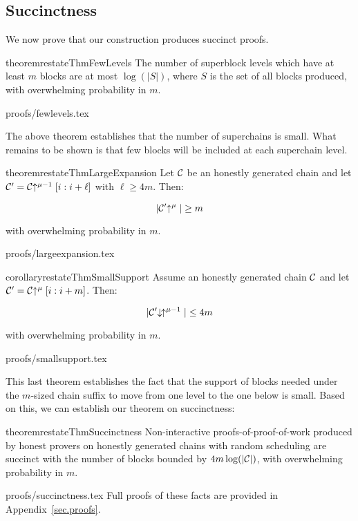 \subsection{Succinctness}

We now prove that our construction produces succinct proofs.

\begin{restatable}{theorem}{restateThmFewLevels}
    \label{thm.few-levels}
    The number of superblock levels which have at least $m$ blocks are at most
    $\log(|S|)$, where $S$ is the set of all blocks produced, with overwhelming
    probability in $m$.
\end{restatable}

\ifonecolumn
{proofs/fewlevels.tex}
\fi

The above theorem establishes that the number of superchains is small. What
remains to be shown is that few blocks will be included at each superchain
level.

\begin{restatable}{theorem}{restateThmLargeExpansion}
    \label{thm.large-expansion}
    Let $\mathcal{C}$ be an honestly generated chain and let
    $\mathcal{C}' = \mathcal{C}\negthickspace\uparrow^{\mu - 1}[i:i + \ell]$ with $\ell \geq 4m$.
    Then:

    \begin{equation}
      |\mathcal{C}'\negthickspace\uparrow^\mu| \geq m
    \end{equation}

    with overwhelming probability in $m$.
\end{restatable}

\ifonecolumn
{proofs/largeexpansion.tex}
\fi

\begin{restatable}{corollary}{restateThmSmallSupport}
    \label{crly.small-support}
    Assume an honestly generated chain $\mathcal{C}$ and let $\mathcal{C}' = \mathcal{C}\negthickspace\uparrow^\mu[i:i + m]$. Then:

    \begin{equation}
      |\mathcal{C}'\negthickspace\downarrow\,\negthickspace\uparrow^{\mu - 1}| \leq 4m
    \end{equation}

    with overwhelming probability in $m$.
\end{restatable}

\ifonecolumn
{proofs/smallsupport.tex}
\fi

This last theorem establishes the fact that the support of blocks needed under
the $m$-sized chain suffix to move from one level to the one below is small.
Based on this, we can establish our theorem on succinctness:

\begin{restatable}{theorem}{restateThmSuccinctness}
    \label{thm.succinctness}
    Non-interactive proofs-of-proof-of-work produced by honest provers on
    honestly generated chains with random scheduling are succinct with the
    number of blocks bounded by $4m \log(|\mathcal{C}|)$, with overwhelming
    probability in $m$.
\end{restatable}

\ifonecolumn
{proofs/succinctness.tex}
\else
Full proofs of these facts are provided in Appendix~\ref{sec.proofs}.
\fi
